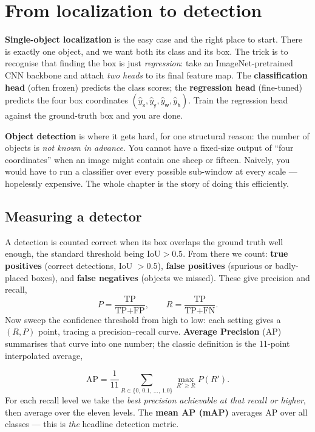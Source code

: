 \documentclass[11pt, oneside]{book}
\begin{document}
\section{From localization to detection}

\textbf{Single-object localization} is the easy case and the right place to start.
There is exactly one object, and we want both its class and its box. The trick is
to recognise that finding the box is just \emph{regression}: take an
ImageNet-pretrained CNN backbone and attach \emph{two heads} to its final feature
map. The \textbf{classification head} (often frozen) predicts the class scores;
the \textbf{regression head} (fine-tuned) predicts the four box coordinates
$(\hat{y}_\mathsf{x},\hat{y}_\mathsf{y},\hat{y}_\mathsf{w},\hat{y}_\mathsf{h})$.
Train the regression head against the ground-truth box and you are done.

\textbf{Object detection} is where it gets hard, for one structural reason: the
number of objects is \emph{not known in advance}. You cannot have a fixed-size
output of ``four coordinates'' when an image might contain one sheep or fifteen.
Naively, you would have to run a classifier over every possible sub-window at
every scale --- hopelessly expensive. The whole chapter is the story of doing
this efficiently.

\subsection{Measuring a detector}

A detection is counted correct when its box overlaps the ground truth well enough,
the standard threshold being $\text{IoU} > 0.5$. From there we count:
\textbf{true positives} (correct detections, IoU $>0.5$), \textbf{false positives}
(spurious or badly-placed boxes), and \textbf{false negatives} (objects we
missed). These give precision and recall,
\[
  P = \frac{\text{TP}}{\text{TP}+\text{FP}}, \qquad
  R = \frac{\text{TP}}{\text{TP}+\text{FN}}.
\]
Now sweep the confidence threshold from high to low: each setting gives a
$(R,P)$ point, tracing a precision--recall curve. \textbf{Average Precision} (AP)
summarises that curve into one number; the classic definition is the 11-point
interpolated average,

\begin{thmbox}[title={Average Precision (11-point interpolation)}]
\[
  \text{AP} = \frac{1}{11}\sum_{R \in \{0,\,0.1,\,\dots,\,1.0\}}
              \max_{R' \ge R} P(R').
\]
For each recall level we take the \emph{best precision achievable at that recall
or higher}, then average over the eleven levels. The \textbf{mean AP (mAP)}
averages AP over all classes --- this is \emph{the} headline detection metric.
\end{thmbox}
\end{document}
